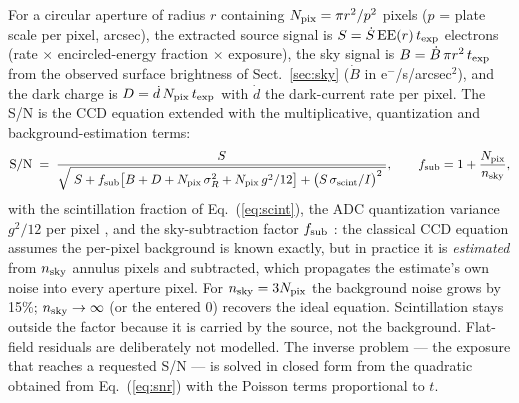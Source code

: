 For a circular aperture of radius $r$ containing
$N_{\rm pix} = \pi r^2 / p^2$ pixels ($p$ = plate scale per pixel,
arcsec), the extracted source signal is
$S = \dot S\,\mathrm{EE}(r)\,t_{\rm exp}$ electrons (rate $\times$
encircled-energy fraction $\times$ exposure), the sky signal is
$B = \dot B\,\pi r^2\, t_{\rm exp}$ from the observed surface
brightness of Sect.~\ref{sec:sky} ($\dot B$ in e$^-$/s/arcsec$^2$), and
the dark charge is $D = \dot d\,N_{\rm pix}\,t_{\rm exp}$ with $\dot d$
the dark-current rate per pixel. The S/N is the CCD equation extended
with the multiplicative, quantization and background-estimation terms:
\begin{equation}
  \mathrm{S/N} \;=\;
  \frac{S}{\sqrt{\;S + f_{\rm sub}\big[B + D + N_{\rm pix}\,\sigma_R^2
        + N_{\rm pix}\, g^2/12\big]
        + \big(S\,\sigma_{\rm scint}/I\big)^2\;}} ,
  \qquad
  f_{\rm sub} = 1 + \frac{N_{\rm pix}}{n_{\rm sky}},
  \label{eq:snr}
\end{equation}
with the scintillation fraction of Eq.~(\ref{eq:scint}), the ADC
quantization variance $g^2/12$ per pixel \citep{janesick2001}, and the
sky-subtraction factor $f_{\rm sub}$ \citep{merline1995}: the classical
CCD equation assumes the per-pixel background is known exactly, but in
practice it is \emph{estimated} from $n_{\rm sky}$ annulus pixels and
subtracted, which propagates the estimate's own noise into every aperture
pixel. For $n_{\rm sky} = 3 N_{\rm pix}$ the background noise grows by
15\%; $n_{\rm sky} \to \infty$ (or the entered 0) recovers the ideal
equation. Scintillation stays outside the factor because it is carried by
the source, not the background. Flat-field
residuals are deliberately not modelled. The inverse problem --- the exposure
that reaches a requested S/N --- is solved in closed form from the quadratic
obtained from Eq.~(\ref{eq:snr}) with the Poisson terms proportional to $t$.

